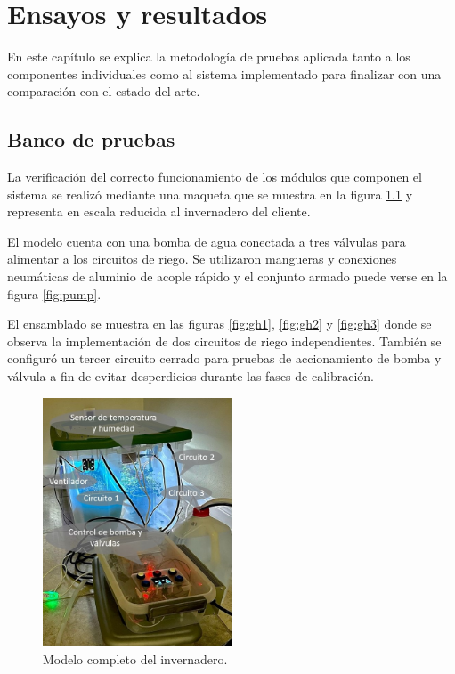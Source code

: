 
\chapter{Ensayos y resultados} %

\label{Chapter4} %

En este capítulo se explica la metodología de pruebas aplicada tanto a los componentes individuales como al sistema implementado para finalizar con una comparación con el estado del arte.


\section{Banco de pruebas}
\label{sec:Banco de pruebas}
%
La verificación del correcto funcionamiento de los módulos que componen el sistema se realizó mediante una maqueta que se muestra en la figura \ref{fig:maqueta} y representa en escala reducida al invernadero del cliente.

El modelo cuenta con una bomba de agua conectada a tres válvulas para alimentar a los circuitos de riego. 
Se utilizaron mangueras y conexiones neumáticas de aluminio de acople rápido y el conjunto armado puede verse en la figura \ref{fig:pump}. 
  
El ensamblado se muestra en las figuras \ref{fig:gh1}, \ref{fig:gh2} y \ref{fig:gh3} donde se observa la implementación de dos circuitos de riego independientes. También se configuró un tercer circuito cerrado para pruebas de accionamiento de bomba y válvula a fin de evitar desperdicios durante las fases de calibración.


\begin{figure}[h]
	\centering
	\includegraphics[width=0.50\textwidth]{./Figures/chapter4/maqueta.jpg}
	\caption[Modelo completo del invernadero]{Modelo completo del invernadero.}
	\label{fig:maqueta}
\end{figure}

